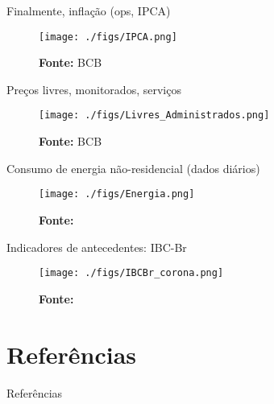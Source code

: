 \documentclass[presentation]{beamer}
\begin{document}
\begin{frame}[label={sec:orga611b61}]{Finalmente, inflação (ops, IPCA)}
\begin{figure}[htb]
\centering
\caption{IPCA e Metas para Inflação} 
\texttt{[image: ./figs/IPCA.png]}
\label{fig:IPCA}
\caption*{\textbf{Fonte:} BCB}
\end{figure}
\end{frame}
\begin{frame}[label={sec:org756aede}]{Preços livres, monitorados, serviços}
\begin{figure}[htb]
\centering
\caption{IPCA e seus componentes: preços livres, monitorados e serviços} 
\texttt{[image: ./figs/Livres\_Administrados.png]}
\label{fig:livres_adm}
\caption*{\textbf{Fonte:} BCB}
\end{figure}
\end{frame}

\begin{frame}[label={sec:orge7370c4}]{Consumo de energia não-residencial (dados diários)}
\begin{figure}[htb]
\centering
\texttt{[image: ./figs/Energia.png]}
\label{fig:cycles}
\caption*{\textbf{Fonte:} \textcite{bastos_2020_impacto}}
\end{figure}
\end{frame}

\begin{frame}[label={sec:org9789174}]{Indicadores de antecedentes: IBC-Br}
\begin{figure}[htb]
\centering
\texttt{[image: ./figs/IBCBr\_corona.png]}
\label{fig:cycles}
\caption*{\textbf{Fonte:} \textcite{bastos_2020_impacto}}
\end{figure}
\end{frame}
\section{Referências}
\label{sec:org2413a03}

\begin{frame}[label={sec:org89fadde}]{Referências}

\printbibliography
\end{frame}
\end{document}
